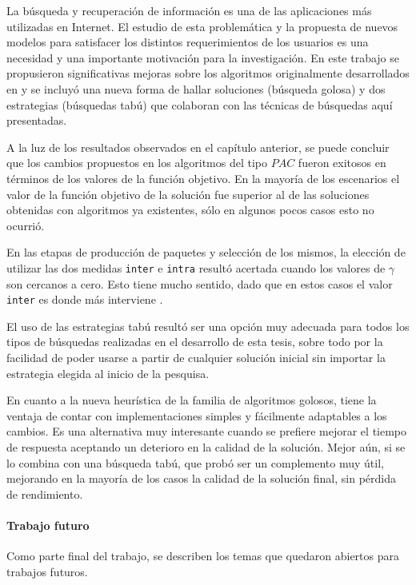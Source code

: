 La búsqueda y recuperación de información es una de las aplicaciones más utilizadas en Internet. El estudio de esta problemática y la propuesta de nuevos modelos para satisfacer los distintos requerimientos de los usuarios es una necesidad y una importante motivación para la investigación. En este trabajo se propusieron significativas mejoras sobre los algoritmos originalmente desarrollados en \cite{journals/tkde/Amer-YahiaBCFMZ14} y se incluyó una nueva forma de hallar soluciones (búsqueda golosa) y dos estrategias (búsquedas tabú) que colaboran con las técnicas de búsquedas aquí presentadas.

A la luz de los resultados observados en el capítulo anterior, se puede concluir que los cambios propuestos en los algoritmos del tipo $PAC$ fueron exitosos en términos de los valores de la función objetivo. En la mayoría de los escenarios el valor de la función objetivo de la solución fue superior al de las soluciones obtenidas con algoritmos ya existentes, sólo en algunos pocos casos esto no ocurrió. 

En las etapas de producción de paquetes y selección de los mismos, la elección de utilizar las dos medidas \texttt{inter} e \texttt{intra} resultó acertada cuando los valores de $\gamma$ son cercanos a cero. Esto tiene mucho sentido, dado que en estos casos el valor \texttt{inter} es donde más interviene .

El uso de las estrategias tabú resultó ser una opción muy adecuada para todos los tipos de búsquedas realizadas en el desarrollo de esta tesis, sobre todo por la facilidad de poder usarse a partir de cualquier solución inicial sin importar la estrategia elegida al inicio de la pesquisa.

En cuanto a la nueva heurística de la familia de algoritmos golosos, tiene la ventaja de contar con implementaciones simples y fácilmente adaptables a los cambios. Es una alternativa muy interesante cuando se prefiere mejorar el tiempo de respuesta aceptando un deterioro en la calidad de la solución. Mejor aún, si se lo combina con una búsqueda tabú, que probó ser un complemento muy útil, mejorando en la mayoría de los casos la calidad de la solución final, sin pérdida de rendimiento. 

\paragraph{Trabajo futuro} Como parte final del trabajo, se describen los temas que quedaron abiertos para trabajos futuros. 

